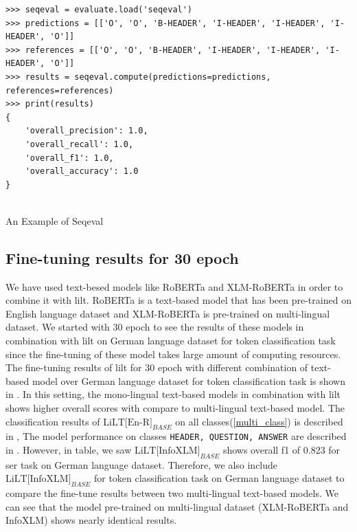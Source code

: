 \begin{listing}[!ht]

\begin{verbatim}
>>> seqeval = evaluate.load('seqeval')
>>> predictions = [['O', 'O', 'B-HEADER', 'I-HEADER', 'I-HEADER', 'I-HEADER', 'O']]
>>> references = [['O', 'O', 'B-HEADER', 'I-HEADER', 'I-HEADER', 'I-HEADER', 'O']]
>>> results = seqeval.compute(predictions=predictions, references=references)
>>> print(results)
{
    'overall_precision': 1.0, 
    'overall_recall': 1.0, 
    'overall_f1': 1.0, 
    'overall_accuracy': 1.0
} 
    
\end{verbatim}

\caption{An Example of Seqeval}
\label{Listing:seqeval_example}   
\end{listing}

\subsection{Fine-tuning results for 30 epoch}
We have used text-besed models like RoBERTa and XLM-RoBERTa in order to combine it with \acrshort{lilt}. RoBERTa is a text-based model that has been pre-trained on English language dataset and XLM-RoBERTa is pre-trained on multi-lingual dataset. We started with 30 epoch to see the results of these models in combination with \acrshort{lilt} on German language dataset for token classification task since the fine-tuning of these model takes large amount of computing resources. The fine-tuning results of \acrshort{lilt} for 30 epoch with different combination of text-based model over German language dataset for token classification task is shown in . In this setting, the mono-lingual text-based models in combination with \acrshort{lilt} shows higher overall scores with compare to multi-lingual text-based model. The classification results of \(\text{LiLT[En-R]}_{BASE}\) on all classes(\ref{multi_class}) is described in , The model performance on classes \verb|HEADER, QUESTION, ANSWER|  are described in . However, in table, we saw \(\text{LiLT[InfoXLM]}_{BASE}\) shows overall f1 of 0.823 for \acrshort{ser} task on German language dataset. Therefore, we also include  \(\text{LiLT[InfoXLM]}_{BASE}\) for token classification task on German language dataset to compare the fine-tune results between two multi-lingual text-based models. We can see that the model pre-trained on multi-lingual dataset (XLM-RoBERTa and InfoXLM) shows nearly identical results. 


